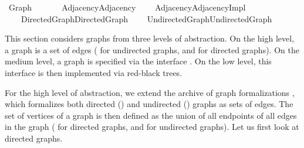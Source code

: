 %
\begin{isabellebody}%
%
%
\isadelimdocument
%
\endisadelimdocument
%
\isatagdocument
%
\isamarkuptrue%
%
\endisatagdocument
{\isafolddocument}%
%
\isadelimdocument
%
\endisadelimdocument
%
\isadelimtheory
%
\endisadelimtheory
%
\isatagtheory
{}\isamarkupfalse%
\ Graph\isanewline
\ \ \isanewline
\ \ \ \ {\isachardoublequoteopen}Adjacency{\isacharslash}{\kern0pt}Adjacency{\isachardoublequoteclose}\isanewline
\ \ \ \ {\isachardoublequoteopen}Adjacency{\isacharslash}{\kern0pt}Adjacency{\isacharunderscore}{\kern0pt}Impl{\isachardoublequoteclose}\isanewline
\ \ \ \ {\isachardoublequoteopen}Directed{\isacharunderscore}{\kern0pt}Graph{\isacharslash}{\kern0pt}Directed{\isacharunderscore}{\kern0pt}Graph{\isachardoublequoteclose}\isanewline
\ \ \ \ {\isachardoublequoteopen}Undirected{\isacharunderscore}{\kern0pt}Graph{\isacharslash}{\kern0pt}Undirected{\isacharunderscore}{\kern0pt}Graph{\isachardoublequoteclose}\isanewline
{}%
\endisatagtheory
{\isafoldtheory}%
%
\isadelimtheory
%
\endisadelimtheory
%
\begin{isamarkuptext}%
This section considers graphs from three levels of abstraction. On the high level, a graph is a set
of edges ( for undirected graphs, and  for directed graphs). On the
medium level, a graph is specified via the interface . On the low level, this
interface is then implemented via red-black trees.%
\end{isamarkuptext}\isamarkuptrue%
%
\isadelimdocument
%
\endisadelimdocument
%
\isatagdocument
%
\isamarkuptrue%
%
\endisatagdocument
{\isafolddocument}%
%
\isadelimdocument
%
\endisadelimdocument
%
\begin{isamarkuptext}%
For the high level of abstraction, we extend the archive of graph formalizations ,
which formalizes both directed () and undirected () graphs as sets of
edges. The set of vertices of a graph is then defined as the union of all endpoints of all edges in
the graph ( for directed graphs, and  for undirected graphs). Let us
first look at directed graphs.%
\end{isamarkuptext}\isamarkuptrue%
%
\isadelimtheory
%
\endisadelimtheory
%
\isatagtheory
{}\isamarkupfalse%
%
\endisatagtheory
{\isafoldtheory}%
%
\isadelimtheory
%
\endisadelimtheory
%
\end{isabellebody}%

